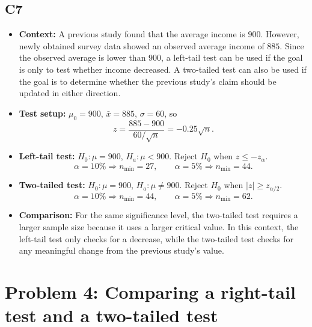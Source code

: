 \subsection*{C7}
\begin{itemize}
	\item \textbf{Context:} A previous study found that the average income is \(900\). However, newly obtained survey data showed an observed average income of \(885\). Since the observed average is lower than \(900\), a left-tail test can be used if the goal is only to test whether income decreased. A two-tailed test can also be used if the goal is to determine whether the previous study's claim should be updated in either direction.
	\item \textbf{Test setup:} \(\mu_0=900\), \(\bar x=885\), \(\sigma=60\), so
	\[
	z=\frac{885-900}{60/\sqrt n}=-0.25\sqrt n.
	\]
	\item \textbf{Left-tail test:} \(H_0:\mu=900\), \(H_a:\mu<900\). Reject \(H_0\) when \(z\le -z_{\alpha}\).
	\[
	\alpha=10\%\Rightarrow n_{\min}=27,
	\qquad
	\alpha=5\%\Rightarrow n_{\min}=44.
	\]
	\item \textbf{Two-tailed test:} \(H_0:\mu=900\), \(H_a:\mu\ne900\). Reject \(H_0\) when \(|z|\ge z_{\alpha/2}\).
	\[
	\alpha=10\%\Rightarrow n_{\min}=44,
	\qquad
	\alpha=5\%\Rightarrow n_{\min}=62.
	\]
	\item \textbf{Comparison:} For the same significance level, the two-tailed test requires a larger sample size because it uses a larger critical value. In this context, the left-tail test only checks for a decrease, while the two-tailed test checks for any meaningful change from the previous study's value.
\end{itemize}

\section{Problem 4: Comparing a right-tail test and a two-tailed test}

